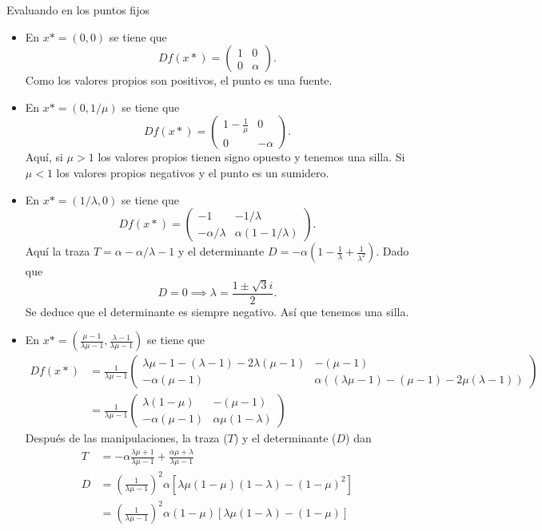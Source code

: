 \documentclass[10pt]{article}
\begin{document}
Evaluando en los puntos fijos
\begin{itemize}
	\item En \(x*=(0,0)\) se tiene que
	\[
	Df(x*) =
	\begin{pmatrix}
	1 & 0\\
	0 & \alpha
	\end{pmatrix}
	.\]
	Como los valores propios son positivos, el punto es una fuente.

	\item En \(x*=(0,1/\mu)\) se tiene que
	\[
	Df(x*) =
	\begin{pmatrix}
	1-\frac{1}{\mu} & 0\\
	0 & -\alpha
	\end{pmatrix}
	.\]
	Aquí, si \(\mu > 1\) los valores propios tienen signo opuesto y tenemos una
	silla. Si \(\mu < 1\) los valores propios negativos y el punto es un
	sumidero.

	\item En \(x*=(1/\lambda, 0)\) se tiene que
	\[
		Df(x*) =
		\begin{pmatrix}
		-1 & -1/\lambda\\
		-\alpha/\lambda & \alpha(1-1/\lambda)
		\end{pmatrix}
	.\]
	Aquí la traza \(T = \alpha - \alpha/\lambda - 1\) y el determinante \(D =
	-\alpha(1 - \frac{1}{\lambda} + \frac{1}{\lambda^2})\). Dado que
	\[
		D = 0 \implies \lambda = \frac{1\pm \sqrt{3}i}{2}
	.\]
	Se deduce que el determinante es siempre negativo. Así que tenemos una
	silla.

	\item En \(x*=(\frac{\mu-1}{\lambda\mu-1},
	\frac{\lambda-1}{\lambda\mu-1})\) se tiene que
	\begin{align*}
		Df(x*)
		&=
		\frac{1}{\lambda\mu-1}
		\begin{pmatrix}
		\lambda\mu-1 - (\lambda-1) - 2\lambda(\mu-1) & -(\mu-1)\\
		-\alpha(\mu-1) & \alpha((\lambda\mu-1) - (\mu-1) - 2\mu(\lambda-1))
		\end{pmatrix}
		\\&=
		\frac{1}{\lambda\mu-1}
		\begin{pmatrix}
		\lambda(1-\mu) & -(\mu-1)\\
		-\alpha(\mu-1) & \alpha\mu(1-\lambda)
		\end{pmatrix}
	\end{align*}
	Después de las manipulaciones, la traza (\(T\)) y el determinante (\(D\))
	dan
	\begin{align*}
	T &= -\alpha \frac{\lambda\mu+1}{\lambda\mu-1} +
	\frac{\alpha\mu+\lambda}{\lambda\mu-1}\\
	D &=
	\left(\frac{1}{\lambda\mu-1}\right)^2 \alpha
	\left[\lambda\mu(1-\mu)(1-\lambda) - (1-\mu)^2\right]
	\\&=
	\left(\frac{1}{\lambda\mu-1}\right)^2 \alpha(1-\mu)
	\left[\lambda\mu(1-\lambda) - (1-\mu)\right]
	\end{align*}
\end{itemize}
\end{document}
